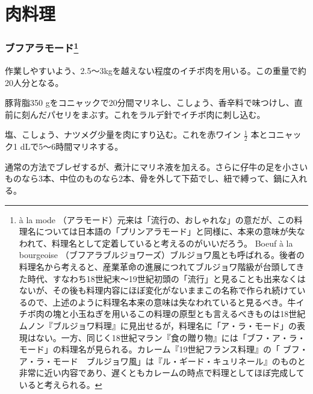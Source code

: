 \hypertarget{ux8089ux6599ux7406}{%
\section{肉料理}\label{ux8089ux6599ux7406}}
\begin{recette}
\hypertarget{boeuf-a-la-mode}{%
\subsubsection[ブフアラモード]{\texorpdfstring{ブフアラモード\footnote{à
  la mode
  （アラモード）元来は「流行の、おしゃれな」の意だが、この料理名については日本語の「プリンアラモード」と同様に、本来の意味が失なわれて、料理名として定着していると考えるのがいいだろう。
  Boeuf à la bourgeoise
  （ブフアラブルジョワーズ）ブルジョワ風とも呼ばれる。後者の料理名から考えると、産業革命の進展につれてブルジョワ階級が台頭してきた時代、すなわち18世紀末〜19世紀初頭の「流行」と見ることも出来なくはないが、その後も料理内容にほぼ変化がないままこの名称で作られ続けているので、上述のように料理名本来の意味は失なわれていると見るべき。牛イチボ肉の塊と小玉ねぎを用いるこの料理の原型とも言えるべきものは18世紀ムノン『ブルジョワ料理』に見出せるが，料理名に「ア・ラ・モード」の表現はない。一方、同じく18世紀マラン『食の贈り物』には「ブフ・ア・ラ・モード」の料理名が見られる。カレーム『19世紀フランス料理』の「
  ブフ・ア・ラ・モード　ブルジョワ風」は『ル・ギード・キュリネール』のものと非常に近い内容であり、遅くともカレームの時点で料理としてほぼ完成していると考えられる。}}{ブフアラモード}}\label{boeuf-a-la-mode}}



作業しやすいよう、2.5〜3kgを越えない程度のイチボ肉を用いる。この重量で約20人分となる。

豚背脂350
gをコニャックで20分間マリネし、こしょう、香辛料で味つけし、直前に刻んだパセリをまぶす。これをラルデ針でイチボ肉に刺し込む。

塩、こしょう、ナツメグ少量を肉にすり込む。これを赤ワイン \(\frac{1}{2}\)
本とコニャック1 dLで5〜6時間マリネする。

通常の方法でブレゼするが、煮汁にマリネ液を加える。さらに仔牛の足を小さいものなら3本、中位のものなら2本、骨を外して下茹でし、紐で縛って、鍋に入れる。


\end{recette}
